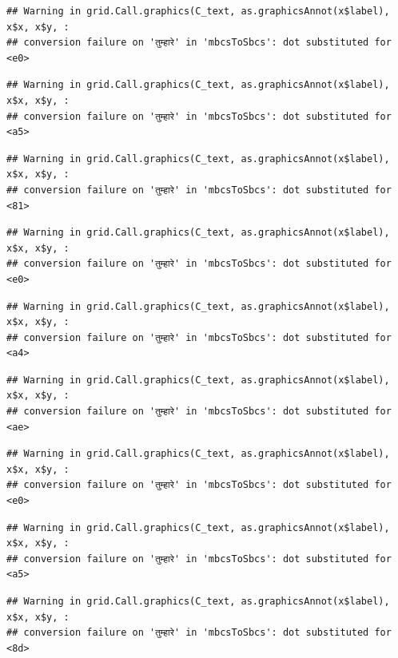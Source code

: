 \documentclass[
]{article}
\begin{document}
\begin{verbatim}
## Warning in grid.Call.graphics(C_text, as.graphicsAnnot(x$label), x$x, x$y, :
## conversion failure on 'तुम्हारे' in 'mbcsToSbcs': dot substituted for <e0>
\end{verbatim}

\begin{verbatim}
## Warning in grid.Call.graphics(C_text, as.graphicsAnnot(x$label), x$x, x$y, :
## conversion failure on 'तुम्हारे' in 'mbcsToSbcs': dot substituted for <a5>
\end{verbatim}

\begin{verbatim}
## Warning in grid.Call.graphics(C_text, as.graphicsAnnot(x$label), x$x, x$y, :
## conversion failure on 'तुम्हारे' in 'mbcsToSbcs': dot substituted for <81>
\end{verbatim}

\begin{verbatim}
## Warning in grid.Call.graphics(C_text, as.graphicsAnnot(x$label), x$x, x$y, :
## conversion failure on 'तुम्हारे' in 'mbcsToSbcs': dot substituted for <e0>
\end{verbatim}

\begin{verbatim}
## Warning in grid.Call.graphics(C_text, as.graphicsAnnot(x$label), x$x, x$y, :
## conversion failure on 'तुम्हारे' in 'mbcsToSbcs': dot substituted for <a4>
\end{verbatim}

\begin{verbatim}
## Warning in grid.Call.graphics(C_text, as.graphicsAnnot(x$label), x$x, x$y, :
## conversion failure on 'तुम्हारे' in 'mbcsToSbcs': dot substituted for <ae>
\end{verbatim}

\begin{verbatim}
## Warning in grid.Call.graphics(C_text, as.graphicsAnnot(x$label), x$x, x$y, :
## conversion failure on 'तुम्हारे' in 'mbcsToSbcs': dot substituted for <e0>
\end{verbatim}

\begin{verbatim}
## Warning in grid.Call.graphics(C_text, as.graphicsAnnot(x$label), x$x, x$y, :
## conversion failure on 'तुम्हारे' in 'mbcsToSbcs': dot substituted for <a5>
\end{verbatim}

\begin{verbatim}
## Warning in grid.Call.graphics(C_text, as.graphicsAnnot(x$label), x$x, x$y, :
## conversion failure on 'तुम्हारे' in 'mbcsToSbcs': dot substituted for <8d>
\end{verbatim}
\end{document}
